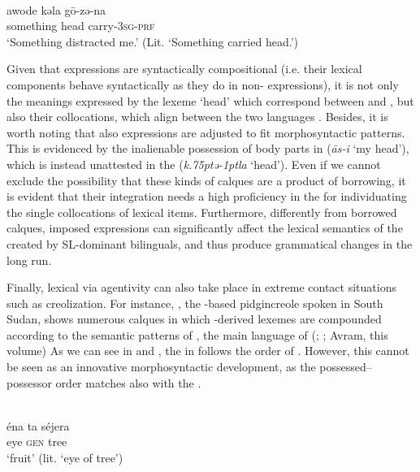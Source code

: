 \documentclass[output=paper]{langsci/langscibook}
\begin{document}
\\
\gll   awode kǝla   gō-zǝ-na \\
       something head carry-\textsc{3sg-prf}\\
\glt   `Something distracted me.' (Lit. ‘Something carried head.’)
\z
\z

Given that  expressions are syntactically compositional (i.e. their lexical components behave syntactically as they do in non- expressions), it is not only the meanings expressed by the lexeme ‘head’ which correspond between   and , but also their  collocations, which align between the two languages \citep[157]{Owens2014}. Besides, it is worth noting that also  expressions are adjusted to fit  morphosyntactic patterns. This is evidenced by the inalienable possession of body parts in   (\textit{{\R}ās-i} ‘my head’), which is instead unattested in the  (\textit{k\kern .75ptǝ\kern -1ptla} ‘head’). Even if we cannot exclude the possibility that these kinds of calques are a product of borrowing, it is evident that their integration needs a high proficiency in the  for individuating the single  collocations of lexical items. Furthermore, differently from borrowed calques, imposed  expressions can significantly affect the lexical semantics of the  created by SL-dominant bilinguals, and thus produce grammatical changes in the long run. 

Finally, lexical  via  agentivity can also take place in extreme contact situations such as creolization. For instance,  , the -based pidgincreole spoken in South Sudan, shows numerous calques in which -derived lexemes are compounded according to the semantic patterns of , the main  language of   (\citealt{Nakao2012}; \citealt[50]{Manfredi2017}; Avram, this volume) As we can see in  and , the  in    follows the order of  . However, this cannot be seen as an innovative morphosyntactic development, as the possessed–possessor order matches also with the  . 

\ea\label{tree}
 \\
\gll   éna ta séjera  \\
       eye \textsc{gen} tree \\
\glt   `fruit’ (lit. ‘eye of tree’)
\end{document}
